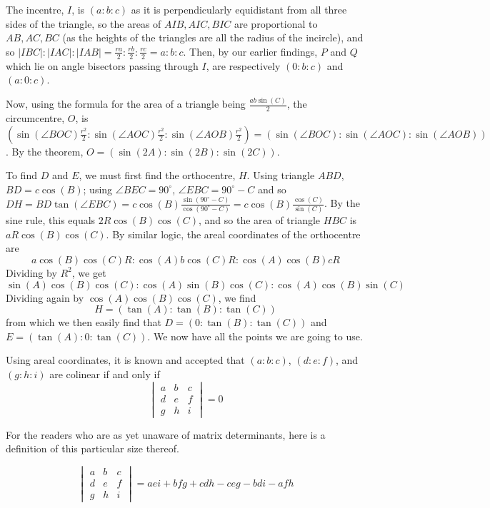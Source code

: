 \documentclass{article}
\begin{document}
The incentre, \(I\), is \((a:b:c)\) as it is perpendicularly equidistant from all three sides of the triangle, so the areas of \(AIB, AIC, BIC\) are proportional to \(AB, AC, BC\) (as the heights of the triangles are all the radius of the incircle), and so \(|IBC|:|IAC|:|IAB|=\frac{ra}{2}:\frac{rb}{2}:\frac{rc}{2}=a:b:c\). Then, by our earlier findings, \(P\) and \(Q\) which lie on angle bisectors passing through \(I\), are respectively \((0:b:c)\) and \((a:0:c)\).

Now, using the formula for the area of a triangle being \(\frac{ab\sin(C)}{2}\), the circumcentre, \(O\), is \((\sin(\angle{}BOC)\frac{r^2}{2}:\sin(\angle{}AOC)\frac{r^2}{2}:\sin(\angle{}AOB)\frac{r^2}{2})=(\sin(\angle{}BOC):\sin(\angle{}AOC):\sin(\angle{}AOB))\). By the  theorem, \(O=(\sin(2A):\sin(2B):\sin(2C))\).

To find \(D\) and \(E\), we must first find the orthocentre, \(H\). Using triangle \(ABD\), \(BD=c\cos(B)\); using \(\angle{}BEC=90^{\circ}\), \(\angle{}EBC=90^{\circ}-C\) and so \(DH=BD\tan(\angle{}EBC)=c\cos(B)\frac{\sin(90^{\circ}-C)}{\cos(90^{\circ}-C)}=c\cos(B)\frac{\cos(C)}{\sin(C)}\). By the sine rule, this equals \(2R\cos(B)\cos(C)\), and so the area of triangle \(HBC\) is \(aR\cos(B)\cos(C)\). By similar logic, the areal coordinates of the orthocentre are
\[a\cos(B)\cos(C)R:\cos(A)b\cos(C)R:\cos(A)\cos(B)cR\]
Dividing by \(R^2\), we get
\[\sin(A)\cos(B)\cos(C):\cos(A)\sin(B)\cos(C):\cos(A)\cos(B)\sin(C)\]
Dividing again by \(\cos(A)\cos(B)\cos(C)\), we find
\[H=(\tan(A):\tan(B):\tan(C))\]
from which we then easily find that \(D=(0:\tan(B):\tan(C))\) and \(E=(\tan(A):0:\tan(C))\). We now have all the points we are going to use.

Using areal coordinates, it is known and accepted that \((a:b:c)\), \((d:e:f)\), and \((g:h:i)\) are colinear if and only if
\[
\begin{vmatrix}
a&b&c\\
d&e&f
\\g&h&i
\end{vmatrix}=0
\]

For the readers who are as yet unaware of matrix determinants, here is a definition of this particular size thereof.

\[
\begin{vmatrix}
a&b&c\\
d&e&f
\\g&h&i
\end{vmatrix}=aei+bfg+cdh-ceg-bdi-afh
\]
\end{document}
